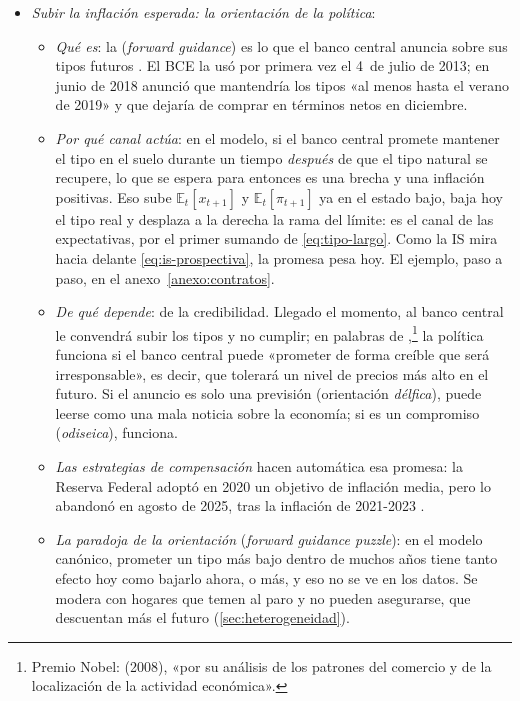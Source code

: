 \documentclass[11pt]{article}
\begin{document}
\begin{itemize}
\item \emph{Subir la inflación esperada: la orientación de la política}\label{sec:orientacion}:
  \begin{itemize}
\item \emph{Qué es}: la  (\emph{forward guidance}) es lo que el banco central anuncia sobre sus tipos futuros . El BCE la usó por primera vez el 4~de julio de 2013\nocite{BCE2013Orientacion}; en junio de 2018 anunció que mantendría los tipos «al menos hasta el verano de 2019» y que dejaría de comprar en términos netos en diciembre\nocite{BCE2018Decisiones}.
\item \emph{Por qué canal actúa}: en el modelo, si el banco central promete mantener el tipo en el suelo durante un tiempo \emph{después} de que el tipo natural se recupere, lo que se espera para entonces es una brecha y una inflación positivas. Eso sube $\mathbb{E}_t[x_{t+1}]$ y $\mathbb{E}_t[\pi_{t+1}]$ ya en el estado bajo, baja hoy el tipo real y desplaza a la derecha la rama del límite\nocite{EggertssonWoodford2003Zero}: es el canal de las expectativas, por el primer sumando de \eqref{eq:tipo-largo}. Como la IS mira hacia delante \eqref{eq:is-prospectiva}, la promesa pesa hoy. El ejemplo, paso a paso, en el anexo~\ref{anexo:contratos}.
\item \emph{De qué depende}: de la credibilidad. Llegado el momento, al banco central le convendrá subir los tipos y no cumplir; en palabras de \textcite{Krugman1998Baaack},\footnote{Premio Nobel:  (2008), «por su análisis de los patrones del comercio y de la localización de la actividad económica»\nocite{Nobel2008Krugman}.} la política funciona si el banco central puede «prometer de forma creíble que será irresponsable», es decir, que tolerará un nivel de precios más alto en el futuro. Si el anuncio es solo una previsión (orientación \emph{délfica}), puede leerse como una mala noticia sobre la economía; si es un compromiso (\emph{odiseica}), funciona\nocite{CampbellEtAl2012Macroeconomic}.
\item \emph{Las estrategias de compensación} hacen automática esa promesa: la Reserva Federal adoptó en 2020 un objetivo de inflación media\nocite{Fed2020Prensa}, pero lo abandonó en agosto de 2025, tras la inflación de 2021-2023\nocite{Fed2025Prensa,Powell2025Jackson} .
\item \emph{La paradoja de la orientación} (\emph{forward guidance puzzle}): en el modelo canónico, prometer un tipo más bajo dentro de muchos años tiene tanto efecto hoy como bajarlo ahora, o más, y eso no se ve en los datos\nocite{DelNegroGiannoniPatterson2023}. Se modera con hogares que temen al paro y no pueden asegurarse, que descuentan más el futuro\nocite{McKayNakamuraSteinsson2016} (\ref{sec:heterogeneidad}).
  \end{itemize}
\end{itemize}
\end{document}
